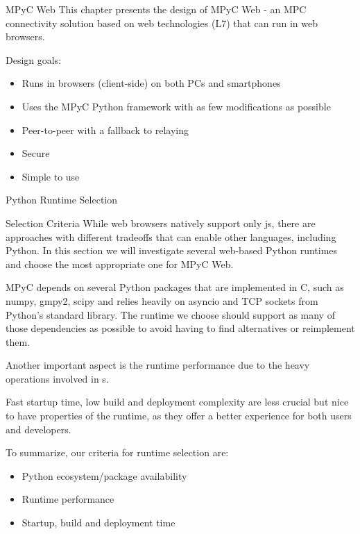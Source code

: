 \begin{block}{MPyC Web}
\label{thesis__090-mpyc-web.md__mpyc-web-1}
This chapter presents the design of MPyC Web - an MPC connectivity solution based on web technologies (L7) that can run in web browsers.

Design goals:

\begin{itemize}
\tightlist
\item
  Runs in browsers (client-side) on both PCs and smartphones
\item
  Uses the MPyC Python framework with as few modifications as possible
\item
  Peer-to-peer with a fallback to relaying
\item
  Secure
\item
  Simple to use
\end{itemize}

\begin{block}{Python Runtime Selection}
\label{thesis__090-mpyc-web.md__python-runtime-selection-1}
\begin{block}{Selection Criteria}
\label{thesis__090-mpyc-web.md__selection-criteria-1}
While web browsers natively support only \gls{js}, there are approaches with different tradeoffs that can enable other languages, including Python. In this section we will investigate several web-based Python runtimes and choose the most appropriate one for MPyC Web.

MPyC depends on several Python packages that are implemented in C, such as numpy, gmpy2, scipy and relies heavily on asyncio and TCP sockets from Python's standard library. The runtime we choose should support as many of those dependencies as possible to avoid having to find alternatives or reimplement them.

Another important aspect is the runtime performance due to the heavy operations involved in s.

Fast startup time, low build and deployment complexity are less crucial but nice to have properties of the runtime, as they offer a better experience for both users and developers.

To summarize, our criteria for runtime selection are:

\begin{itemize}
\tightlist
\item
  Python ecosystem/package availability
\item
  Runtime performance
\item
  Startup, build and deployment time
\end{itemize}
\end{block}


\end{block}
\end{block}
